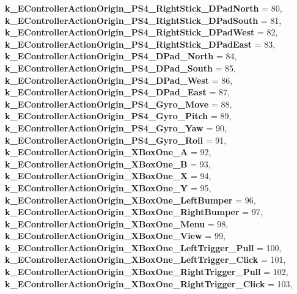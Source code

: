 \begin{DoxyCompactItemize}
{\bfseries k\+\_\+\+E\+Controller\+Action\+Origin\+\_\+\+P\+S4\+\_\+\+Right\+Stick\+\_\+\+D\+Pad\+North} = 80, 
{\bfseries k\+\_\+\+E\+Controller\+Action\+Origin\+\_\+\+P\+S4\+\_\+\+Right\+Stick\+\_\+\+D\+Pad\+South} = 81, 
{\bfseries k\+\_\+\+E\+Controller\+Action\+Origin\+\_\+\+P\+S4\+\_\+\+Right\+Stick\+\_\+\+D\+Pad\+West} = 82, 
{\bfseries k\+\_\+\+E\+Controller\+Action\+Origin\+\_\+\+P\+S4\+\_\+\+Right\+Stick\+\_\+\+D\+Pad\+East} = 83, 
\newline
{\bfseries k\+\_\+\+E\+Controller\+Action\+Origin\+\_\+\+P\+S4\+\_\+\+D\+Pad\+\_\+\+North} = 84, 
{\bfseries k\+\_\+\+E\+Controller\+Action\+Origin\+\_\+\+P\+S4\+\_\+\+D\+Pad\+\_\+\+South} = 85, 
{\bfseries k\+\_\+\+E\+Controller\+Action\+Origin\+\_\+\+P\+S4\+\_\+\+D\+Pad\+\_\+\+West} = 86, 
{\bfseries k\+\_\+\+E\+Controller\+Action\+Origin\+\_\+\+P\+S4\+\_\+\+D\+Pad\+\_\+\+East} = 87, 
\newline
{\bfseries k\+\_\+\+E\+Controller\+Action\+Origin\+\_\+\+P\+S4\+\_\+\+Gyro\+\_\+\+Move} = 88, 
{\bfseries k\+\_\+\+E\+Controller\+Action\+Origin\+\_\+\+P\+S4\+\_\+\+Gyro\+\_\+\+Pitch} = 89, 
{\bfseries k\+\_\+\+E\+Controller\+Action\+Origin\+\_\+\+P\+S4\+\_\+\+Gyro\+\_\+\+Yaw} = 90, 
{\bfseries k\+\_\+\+E\+Controller\+Action\+Origin\+\_\+\+P\+S4\+\_\+\+Gyro\+\_\+\+Roll} = 91, 
\newline
{\bfseries k\+\_\+\+E\+Controller\+Action\+Origin\+\_\+\+X\+Box\+One\+\_\+A} = 92, 
{\bfseries k\+\_\+\+E\+Controller\+Action\+Origin\+\_\+\+X\+Box\+One\+\_\+B} = 93, 
{\bfseries k\+\_\+\+E\+Controller\+Action\+Origin\+\_\+\+X\+Box\+One\+\_\+X} = 94, 
{\bfseries k\+\_\+\+E\+Controller\+Action\+Origin\+\_\+\+X\+Box\+One\+\_\+Y} = 95, 
\newline
{\bfseries k\+\_\+\+E\+Controller\+Action\+Origin\+\_\+\+X\+Box\+One\+\_\+\+Left\+Bumper} = 96, 
{\bfseries k\+\_\+\+E\+Controller\+Action\+Origin\+\_\+\+X\+Box\+One\+\_\+\+Right\+Bumper} = 97, 
{\bfseries k\+\_\+\+E\+Controller\+Action\+Origin\+\_\+\+X\+Box\+One\+\_\+\+Menu} = 98, 
{\bfseries k\+\_\+\+E\+Controller\+Action\+Origin\+\_\+\+X\+Box\+One\+\_\+\+View} = 99, 
\newline
{\bfseries k\+\_\+\+E\+Controller\+Action\+Origin\+\_\+\+X\+Box\+One\+\_\+\+Left\+Trigger\+\_\+\+Pull} = 100, 
{\bfseries k\+\_\+\+E\+Controller\+Action\+Origin\+\_\+\+X\+Box\+One\+\_\+\+Left\+Trigger\+\_\+\+Click} = 101, 
{\bfseries k\+\_\+\+E\+Controller\+Action\+Origin\+\_\+\+X\+Box\+One\+\_\+\+Right\+Trigger\+\_\+\+Pull} = 102, 
{\bfseries k\+\_\+\+E\+Controller\+Action\+Origin\+\_\+\+X\+Box\+One\+\_\+\+Right\+Trigger\+\_\+\+Click} = 103, 

\end{DoxyCompactItemize}
